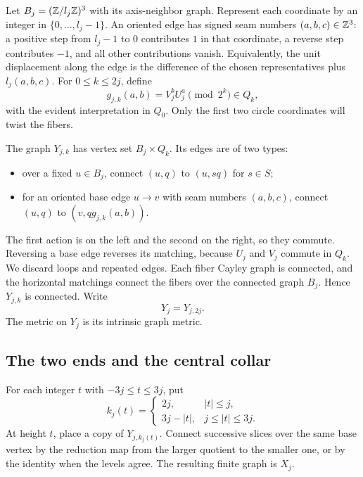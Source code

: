 Let $B_j=(\mathbb Z/l_j\mathbb Z)^3$ with its axis-neighbor graph. Represent each
coordinate by an integer in $\{0,\ldots,l_j-1\}$. An oriented edge has
signed seam numbers $(a,b,c)\in\mathbb Z^3$: a positive step from $l_j-1$ to $0$
contributes $1$ in that coordinate, a reverse step contributes $-1$, and
all other contributions vanish. Equivalently, the unit displacement along
the edge is the difference of the chosen representatives plus
$l_j(a,b,c)$. For $0\leq k\leq2j$, define
\begin{equation}\label{geom:transport}
 g_{j,k}(a,b)=V_j^bU_j^a\pmod {2^k}\in Q_k,
\end{equation}
with the evident interpretation in $Q_0$. Only the first two circle
coordinates will twist the fibers.

The graph $Y_{j,k}$ has vertex set $B_j\times Q_k$. Its edges are of two
types:
\begin{itemize}
\item over a fixed $u\in B_j$, connect $(u,q)$ to $(u,sq)$ for $s\in S$;
\item for an oriented base edge $u\to v$ with seam numbers $(a,b,c)$,
connect $(u,q)$ to $(v,qg_{j,k}(a,b))$.
\end{itemize}
The first action is on the left and the second on the right, so they commute.
Reversing a base edge reverses its matching, because $U_j$ and $V_j$ commute
in $Q_k$. We discard loops and repeated edges. Each fiber Cayley graph is
connected, and the horizontal matchings connect the fibers over the
connected graph $B_j$. Hence $Y_{j,k}$ is connected. Write
\[
 Y_j=Y_{j,2j}.
\]
The metric on $Y_j$ is its intrinsic graph metric.

\subsection{The two ends and the central collar}

For each integer $t$ with $-3j\leq t\leq3j$, put
\begin{equation}\label{geom:height-profile}
 k_j(t)=
 \begin{cases}
  2j,& |t|\leq j,\\
  3j-|t|,& j\leq |t|\leq3j.
 \end{cases}
\end{equation}
At height $t$, place a copy of $Y_{j,k_j(t)}$. Connect successive slices over
the same base vertex by the reduction map from the larger quotient to the
smaller one, or by the identity when the levels agree. The resulting finite
graph is $X_j$.

